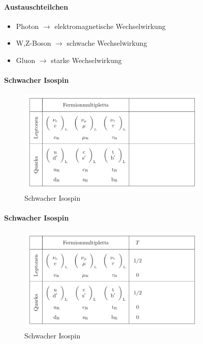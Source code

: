 
\begin{iframe}	
	
	
	\framesubtitle{Austauschteilchen}
	\begin{itemize}
		\item Photon $\rightarrow$ elektromagnetische Wechselwirkung
		\pause
		\item W,Z-Boson $\rightarrow$ schwache Wechselwirkung	
		\pause
		\item Gluon $\rightarrow$ starke Wechselwirkung	
	\end{itemize}

\end{iframe}

\begin{iframe}
	\framesubtitle{Schwacher Isospin}
	\begin{figure}
		\includegraphics[height=5cm]{img/isospin1}
		\caption*{Schwacher Isospin\cite{povh}}
	\end{figure}
\end{iframe}
\begin{nframe}
	\framesubtitle{Schwacher Isospin}
	\begin{figure}
		\includegraphics[height=5cm]{img/isospin2}
		\caption*{Schwacher Isospin\cite{povh}}
	\end{figure}
\end{nframe}

